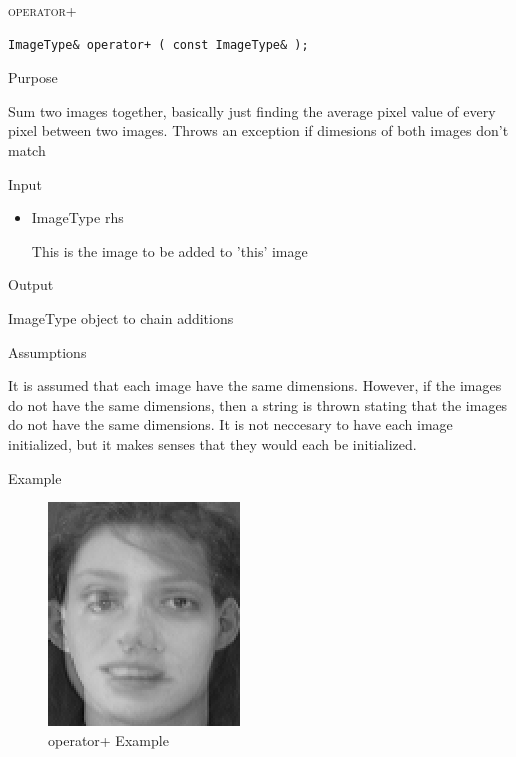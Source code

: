 \documentclass[pdftex, 11pt]{article}
\begin{document}
\begin{description}
\begin{description}
		\end{description}


	\item{\textsc{operator+}}
		\begin{description}

\begin{lstlisting}
ImageType& operator+ ( const ImageType& );
\end{lstlisting}

			\item{Purpose}

				
				Sum two images together, basically just finding
				the average pixel value of
				every pixel between two images.  Throws an
				exception if dimesions of both
				images don't match

			\item{Input}

				\begin{itemize}
						
					\item{ImageType rhs}

						This is the image to be added to
						'this' image

				\end{itemize}

			\item{Output}

				ImageType object to chain additions

			\item{Assumptions}

				It is assumed that each image have the same dimensions.
				However, if the images do not have the same dimensions,
				then a string is thrown stating that the images do
				not have the same dimensions. It is not neccesary to have
				each image initialized, but it makes senses
				that they would each be initialized.

			\item{Example}

				\begin{figure}[ht!]
					\centering
					\caption{operator+ Example}
				\includegraphics{images/outasum.png}
			\end{figure}



\end{description}
\end{description}
\end{document}
